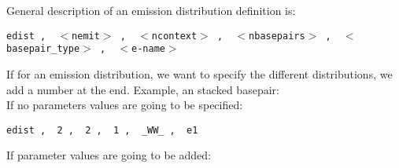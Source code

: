 \noindent
General description of an emission distribution  definition is:\\

\noindent
\begin{footnotesize}
\texttt{edist \sep\, $<$nemit$>$ \sep\, $<$ncontext$>$ \sep\, $<$nbasepairs$>$ \sep\, $<$basepair\_type$>$ \sep\, $<$e-name$>$}\\
\end{footnotesize}

\noindent
If for an emission distribution, we want to specify the different distributions, we
add a number at the end. Example, an stacked basepair:\\

\noindent
If no parameters values are going to be specified:\\

\begin{footnotesize}
\noindent
  \texttt{edist \sep\, 2 \sep\, 2 \sep\, 1 \sep\, \_WW\_ \sep\, e1}\\
\end{footnotesize}

\noindent
If parameter values are going to be added:\\

